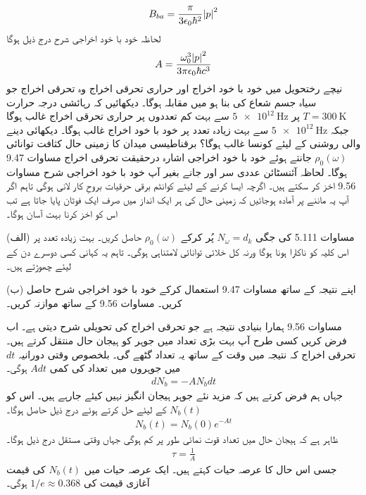 \begin{align}
	B_{ba} = \frac{\pi}{3\epsilon_0\hbar^2}\abs{p}^2
\end{align}
لحاظہ خود با خود اخراجی شرح درج ذیل ہوگا
\begin{align}
	A = \frac{\omega^3_0\abs{p}^2}{3\pi\epsilon_0\hbar c^3}
\end{align}
نیچے رختحویل میں خود با خود اخراج اور حراری تحرقی اخراج وہ تحرقی اخراج جو سیاہ جسم شعاع کی بنا ہو میں مقابلہ ہوگا۔ دیکھائیں کہ رہائشی درجہ حرارت \(T = \SI{300}{\kelvin}\) پر \(\SI{5e12}{\hertz}\) سے بہت کم تعددوں پر حراری تحرقی اخراج غالب ہوگا جبکہ \(\SI{5e12}{\hertz}\) سے بہت زیادہ تعدد پر خود با خود اخراج غالب ہوگا۔ دیکھائی دینے والی روشنی کے لیئے کونسا غالب ہوگا؟
برقناطیسی میدان کا زمینی حال کثافت توانائی \(\rho_0(\omega)\) جانتے ہوئے خود با خود اخراجی اشارہ درحقیقت تحرقی اخراج مساوات \num{9.47} ہوگا۔ لحاظہ آئنسٹائن عددی سر  اور  جانے بغیر آپ خود با خود اخراجی شرح مساوات \num{9.56} اخز کر سکتے ہیں۔ اگرچہ ایسا کرنے کے لیئے کوانٹم برقی حرقیات بروحِ کار لانی ہوگی تاہم اگر آپ یہ ماننے پر آمادہ ہوجائیں کہ زمینی حال کی ہر ایک انداز میں صرف ایک فوٹان پایا جاتا ہے تب اس کو اخز کرنا بہت آسان ہوگا۔

(الف) مساوات \num{5.111} کی جگی \(N_\omega = d_k\) پُر کرکے \(\rho_0(\omega)\) حاصل کریں۔ بہت زیادہ تعدد پر اس کلیہ کو ناکارا ہونا ہوگا ورنہ کل خلائی توانائی لامتناہی ہوگی۔ تاہم یہ کہانی کسی دوسرے دن کے لیئے چھوڑتے ہیں۔

(ب) اپنے نتیجہ کے ساتھ مساوات \num{9.47} استعمال کرکے خود با خود اخراجی شرح حاصل کریں۔ مساوات \num{9.56} کے ساتھ موازنہ کریں۔


مساوات \num{9.56} ہمارا بنیادی نتیجہ ہے جو تحرقی اخراج کی تحویلی شرح دیتی ہے۔ اب فرض کریں کسی طرح آپ بہت بڑی تعداد میں جوہر کو ہیجان حال منتقل کرتے ہیں۔ تحرقی اخراج کہ نتیجہ میں وقت کے ساتھ یہ تعداد گٹھے گی۔ بلخصوص وقتی دورانیہ \(dt\) میں جوہروں میں تعداد کی کمی \(Adt\) ہوگی۔
\begin{align}
	dN_b = -AN_bdt
\end{align}
جہاں ہم فرض کرتے ہیں کہ مزید نئے جوہر ہیجان انگیز نہیں کیئے جارہے ہیں۔ اس کو \(N_b(t)\) کے لیئے حل کرتے ہوئے درج ذیل حاصل ہوگا۔
\begin{align}
	N_b(t) = N_b(0)e^{-At}
\end{align}
ظاہر ہے کہ ہیجان حال میں تعداد قوت نمائی طور پر کم ہوگی جہاں وقتی مستقل درج ذیل ہوگا۔
\begin{align}
	\tau = \frac{1}{A}
\end{align}
جسی اس حال کا عرصہ حیات کہتے ہیں۔ ایک عرصہ حیات میں \(N_b(t)\) کی قیمت آغازی قیمت کی \(1/e \approx \num{0.368}\) ہوگی۔

